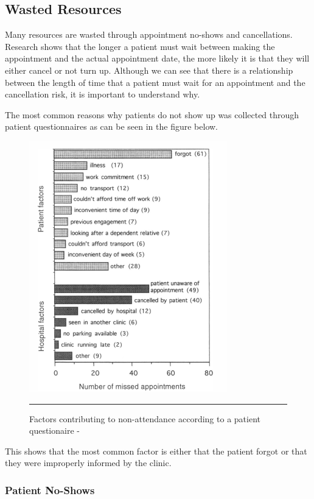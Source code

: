 \subsection{Wasted Resources}

Many resources are wasted through appointment no-shows and cancellations. Research shows that the longer a patient must wait between making the appointment and the actual appointment date, the more likely it is that they will either cancel or not turn up\cite{Gallucci}. Although we can see that there is a relationship between the length of time that a patient must wait for an appointment and the cancellation risk, it is important to understand why.

The most common reasons why patients do not show up was collected through patient questionnaires as can be seen in the figure below.

\begin{figure}[htbp]
	\centering
		\includegraphics{Figures/MissedAppointmentsStoneEtAl.png}
		\rule{35em}{0.5pt}
	\caption[Factors contributing to non-attendance according to a patient questionaire - \cite{Stone}]{Factors contributing to non-attendance according to a patient questionaire - \cite{Stone}}
	\label{fig:NonAttendance}
\end{figure}

This shows that the most common factor is either that the patient forgot or that they were improperly informed by the clinic.

\subsubsection{Patient No-Shows}


